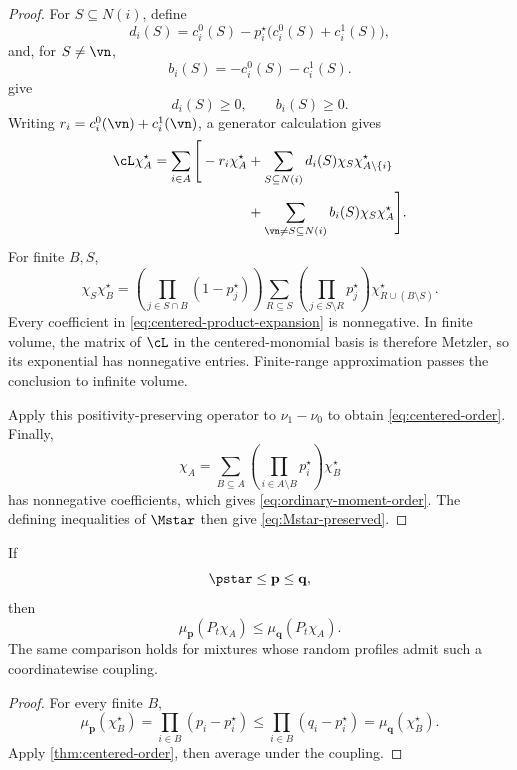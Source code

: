 \begin{proof}
For \(S\subseteq N(i)\), define
\[
  d_i(S)
  =
  c_i^0(S)
  -
  p_i^\star\bigl(c_i^0(S)+c_i^1(S)\bigr),
\]
and, for \(S\ne\vn\),
\[
  b_i(S)=-c_i^0(S)-c_i^1(S).
\]
give
\begin{equation}
  d_i(S)\ge0,
  \qquad
  b_i(S)\ge0.
  \label{eq:db-positive}
\end{equation}
Writing \(r_i=c_i^0(\vn)+c_i^1(\vn)\), a generator calculation gives
\begin{align}
  \cL\chi_A^\star
  =
  \sum_{i\in A}
  \Bigg[
  -r_i\chi_A^\star
  &+
  \sum_{S\subseteq N(i)}
  d_i(S)\chi_S\chi_{A\setminus\{i\}}^\star
  \notag\\
  &+
  \sum_{\vn\ne S\subseteq N(i)}
  b_i(S)\chi_S\chi_A^\star
  \Bigg].
  \label{eq:centered-generator}
\end{align}
For finite \(B,S\),
\begin{equation}
  \chi_S\chi_B^\star
  =
  \left(
    \prod_{j\in S\cap B}(1-p_j^\star)
  \right)
  \sum_{R\subseteq S}
  \left(
    \prod_{j\in S\setminus R}p_j^\star
  \right)
  \chi_{R\cup(B\setminus S)}^\star.
  \label{eq:centered-product-expansion}
\end{equation}
Every coefficient in \eqref{eq:centered-product-expansion} is
nonnegative. In finite volume, the matrix of \(\cL\) in the
centered-monomial basis is therefore Metzler, so its exponential has
nonnegative entries. Finite-range approximation passes the conclusion
to infinite volume.

Apply this positivity-preserving operator to
\(\nu_1-\nu_0\) to obtain \eqref{eq:centered-order}. Finally,
\[
  \chi_A
  =
  \sum_{B\subseteq A}
  \left(
    \prod_{i\in A\setminus B}p_i^\star
  \right)
  \chi_B^\star
\]
has nonnegative coefficients, which gives
\eqref{eq:ordinary-moment-order}. The defining inequalities of
\(\Mstar\) then give \eqref{eq:Mstar-preserved}.
\end{proof}

\begin{corollary}
\label{cor:product-profile-order}
If
\[
  \pstar\le\mathbf p\le\mathbf q,
\]
then
\[
  \mu_{\mathbf p}(P_t\chi_A)
  \le
  \mu_{\mathbf q}(P_t\chi_A).
\]
The same comparison holds for mixtures whose random profiles admit
such a coordinatewise coupling.
\end{corollary}

\begin{proof}
For every finite \(B\),
\[
  \mu_{\mathbf p}(\chi_B^\star)
  =
  \prod_{i\in B}(p_i-p_i^\star)
  \le
  \prod_{i\in B}(q_i-p_i^\star)
  =
  \mu_{\mathbf q}(\chi_B^\star).
\]
Apply \cref{thm:centered-order}, then average under the coupling.
\end{proof}

